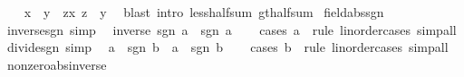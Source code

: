 \begin{isabellebody}
\isanewline
\ \ \isamarkupfalse%
\ {\isachardoublequoteopen}x\ {\isacharless}{\kern0pt}\ y\ {\isasymLongrightarrow}\ {\isasymexists}z{\isachargreater}{\kern0pt}x{\isachardot}{\kern0pt}\ z\ {\isacharless}{\kern0pt}\ y{\isachardoublequoteclose}\ \isamarkupfalse%
\ {\isacharparenleft}{\kern0pt}blast\ intro{\isacharbang}{\kern0pt}{\isacharcolon}{\kern0pt}\ less{\isacharunderscore}{\kern0pt}half{\isacharunderscore}{\kern0pt}sum\ gt{\isacharunderscore}{\kern0pt}half{\isacharunderscore}{\kern0pt}sum{\isacharparenright}{\kern0pt}\isanewline
{}\isamarkupfalse%
%
\endisatagproof
{\isafoldproof}%
%
\isadelimproof
\isanewline
%
\endisadelimproof
\isanewline
{}\isamarkupfalse%
\ field{\isacharunderscore}{\kern0pt}abs{\isacharunderscore}{\kern0pt}sgn%
\isadelimproof
\ %
\endisadelimproof
%
\isatagproof
\isacommand{{\isachardot}{\kern0pt}{\isachardot}{\kern0pt}}\isamarkupfalse%
%
\endisatagproof
{\isafoldproof}%
%
\isadelimproof
%
\endisadelimproof
\isanewline
\isanewline
{}\isamarkupfalse%
\ inverse{\isacharunderscore}{\kern0pt}sgn\ {\isacharbrackleft}{\kern0pt}simp{\isacharbrackright}{\kern0pt}{\isacharcolon}{\kern0pt}\isanewline
\ \ {\isachardoublequoteopen}inverse\ {\isacharparenleft}{\kern0pt}sgn\ a{\isacharparenright}{\kern0pt}\ {\isacharequal}{\kern0pt}\ sgn\ a{\isachardoublequoteclose}\isanewline
%
\isadelimproof
\ \ %
\endisadelimproof
%
\isatagproof
{}\isamarkupfalse%
\ {\isacharparenleft}{\kern0pt}cases\ a\ {}\ rule{\isacharcolon}{\kern0pt}\ linorder{\isacharunderscore}{\kern0pt}cases{\isacharparenright}{\kern0pt}\ simp{\isacharunderscore}{\kern0pt}all%
\endisatagproof
{\isafoldproof}%
%
\isadelimproof
\isanewline
%
\endisadelimproof
\isanewline
{}\isamarkupfalse%
\ divide{\isacharunderscore}{\kern0pt}sgn\ {\isacharbrackleft}{\kern0pt}simp{\isacharbrackright}{\kern0pt}{\isacharcolon}{\kern0pt}\isanewline
\ \ {\isachardoublequoteopen}a\ {\isacharslash}{\kern0pt}\ sgn\ b\ {\isacharequal}{\kern0pt}\ a\ {\isacharasterisk}{\kern0pt}\ sgn\ b{\isachardoublequoteclose}\isanewline
%
\isadelimproof
\ \ %
\endisadelimproof
%
\isatagproof
{}\isamarkupfalse%
\ {\isacharparenleft}{\kern0pt}cases\ b\ {}\ rule{\isacharcolon}{\kern0pt}\ linorder{\isacharunderscore}{\kern0pt}cases{\isacharparenright}{\kern0pt}\ simp{\isacharunderscore}{\kern0pt}all%
\endisatagproof
{\isafoldproof}%
%
\isadelimproof
\isanewline
%
\endisadelimproof
\isanewline
{}\isamarkupfalse%
\ nonzero{\isacharunderscore}{\kern0pt}abs{\isacharunderscore}{\kern0pt}inverse{\isacharcolon}{\kern0pt}\isanewline

\end{isabellebody}
